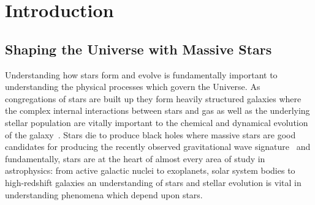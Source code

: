 \chapter{Introduction}\label{ch:intro}

\section{Shaping the Universe with Massive Stars} %
\label{sec:massive_stars}
Understanding how stars form and evolve is fundamentally important to understanding the physical processes which govern the Universe.
As congregations of stars are built up they form heavily structured galaxies where the complex internal interactions between stars and gas as well as the underlying stellar population are vitally important to the chemical and dynamical evolution of the galaxy~\citep[e.g.][]{2014ARA&A..52..291C}.
Stars die to produce black holes where massive stars are good candidates for producing the recently observed gravitational wave signature~\citep{2016PhRvL.116f1102A,2016arXiv160204735L,2016arXiv160300511W} and fundamentally, stars are at the heart of almost every area of study in astrophysics: from active galactic nuclei to exoplanets, solar system bodies to high-redshift galaxies an understanding of stars and stellar evolution is vital in understanding phenomena which depend upon stars.

